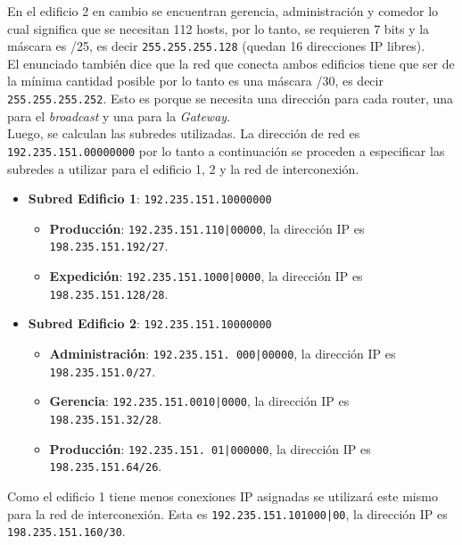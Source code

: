En el edificio 2 en cambio se encuentran gerencia, administración y comedor lo cual significa que se necesitan 112 hosts, por lo tanto, se requieren 7 bits y la máscara es /25, es decir \texttt{255.255.255.128} (quedan 16 direcciones IP libres).\\

El enunciado también dice que la red que conecta ambos edificios tiene que ser de la mínima cantidad posible por lo tanto es una máscara /30, es decir \texttt{255.255.255.252}. Esto es porque se necesita una dirección para cada router, una para el \textit{broadcast} y una para la \textit{Gateway}. \\

Luego, se calculan las subredes utilizadas. La dirección de red es \texttt{192.235.151.00000000} por lo tanto a continuación se proceden a especificar las subredes a utilizar para el edificio 1, 2 y la red de interconexión.\\

\begin{itemize}
    \item \textbf{Subred Edificio 1}: \texttt{192.235.151.10000000} 
    \begin{itemize}
        \item \textbf{Producción}: \texttt{192.235.151.110|00000}, la dirección IP es \texttt{198.235.151.192/27}.
        \item \textbf{Expedición}: \texttt{192.235.151.1000|0000}, la dirección IP es \texttt{198.235.151.128/28}.
    \end{itemize}
    \item \textbf{Subred Edificio 2}: \texttt{192.235.151.10000000} 
    \begin{itemize}
        \item \textbf{Administración}: \texttt{192.235.151. 000|00000}, la dirección IP es \texttt{198.235.151.0/27}.
        \item \textbf{Gerencia}: \texttt{192.235.151.0010|0000}, la dirección IP es \texttt{198.235.151.32/28}.
        \item \textbf{Producción}: \texttt{192.235.151. 01|000000}, la dirección IP es \texttt{198.235.151.64/26}.
    \end{itemize}
\end{itemize}

Como el edificio 1 tiene menos conexiones IP asignadas se utilizará este mismo para la red de interconexión. Esta es \texttt{192.235.151.101000|00}, la dirección IP es \texttt{198.235.151.160/30}.\\

